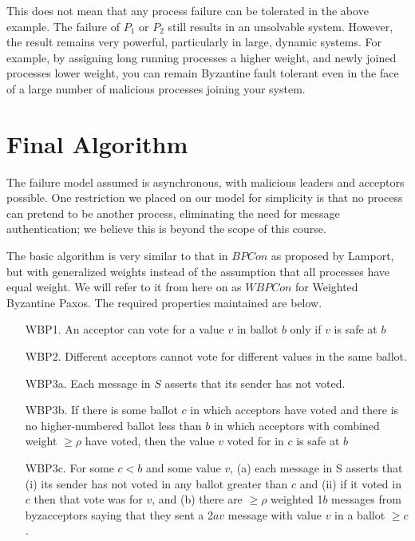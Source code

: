 \documentclass[conference]{IEEEtran}
\begin{document}
This does not mean that any process failure can be tolerated in the above example. The failure of $P_1$ or $P_2$ still results in an unsolvable system. However, the result remains very powerful, particularly in large, dynamic systems. For example, by assigning long running processes a higher weight, and newly joined processes lower weight, you can remain Byzantine fault tolerant even in the face of a large number of malicious processes joining your system.

\section{Final Algorithm}
The failure model assumed is asynchronous, with malicious leaders and acceptors possible. One restriction we placed on our model for simplicity is that no process can pretend to be another process, eliminating the need for message authentication; we believe this is beyond the scope of this course.

The basic algorithm is very similar to that in $BPCon$ as proposed by Lamport, but with generalized weights instead of the assumption that all processes have equal weight. We will refer to it from here on as $WBPCon$ for Weighted Byzantine Paxos. The required properties maintained are below.

\smallskip
\begin{enumerate}[leftmargin=4em]
\item[WBP1.] An acceptor can vote for a value $v$ in ballot $b$ only if $v$ is safe at $b$
\item[WBP2.] Different acceptors cannot vote for different values in the same ballot.
\item[WBP3a.] Each message in $S$ asserts that its sender has not voted.
\item[WBP3b.] If there is some ballot $c$ in which acceptors have voted and there is no higher-numbered ballot less than $b$ in which acceptors with combined weight $\geq \rho$ have voted, then the value $v$ voted for in $c$ is safe at $b$
\item[WBP3c.] For some $c < b$ and some value $v$, (a) each message in S asserts that (i) its sender has not voted in any ballot greater than $c$ and (ii) if it voted in $c$ then that vote was for $v$, and (b) there are $\geq \rho$ weighted 1$b$ messages from byzacceptors saying that they sent a 2$av$ message with value $v$ in a ballot $\geq c$.
\end{enumerate}
\smallskip
\end{document}
